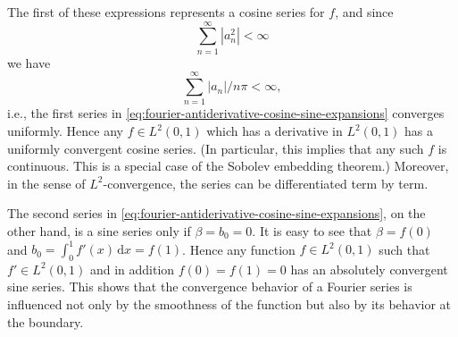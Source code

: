 The first of these expressions represents a cosine series for $f$, and since \[\sum_{n=1}^\infty|a_n^2|<\infty\] we have \[\sum_{n=1}^\infty|a_n|/n\pi<\infty,\] i.e., the first series in \eqref{eq:fourier-antiderivative-cosine-sine-expansions} converges uniformly. Hence any $f\in L^2(0,1)$ which has a derivative in $L^2(0,1)$ has a uniformly convergent cosine series. (In particular, this implies that any such $f$ is continuous. This is a special case of the Sobolev embedding theorem.) Moreover, in the sense of $L^2$-convergence, the series can be differentiated term by term.

The second series in \eqref{eq:fourier-antiderivative-cosine-sine-expansions}, on the other hand, is a sine series only if $\beta=b_0=0$. It is easy to see that $\beta=f(0)$ and $b_0=\int_0^1 f'(x)\,\mathrm{d}x=f(1)$. Hence any function $f\in L^2(0,1)$ such that $f'\in L^2(0,1)$ and in addition $f(0)=f(1)=0$ has an absolutely convergent sine series. This shows that the convergence behavior of a Fourier series is influenced not only by the smoothness of the function but also by its behavior at the boundary.
